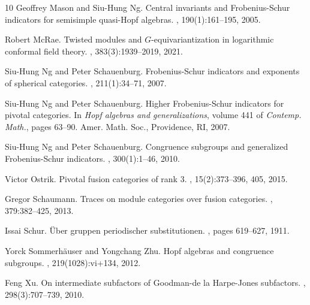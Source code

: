 \documentclass{amsart}
\begin{document}
\begin{thebibliography}{10}
Geoffrey Mason and Siu-Hung Ng.
\newblock Central invariants and {F}robenius-{S}chur indicators for semisimple
  quasi-{H}opf algebras.
, 190(1):161--195, 2005.

Robert McRae.
\newblock Twisted modules and {$G$}-equivariantization in logarithmic conformal
  field theory.
, 383(3):1939--2019, 2021.

Siu-Hung Ng and Peter Schauenburg.
\newblock Frobenius-{S}chur indicators and exponents of spherical categories.
, 211(1):34--71, 2007.

Siu-Hung Ng and Peter Schauenburg.
\newblock Higher {F}robenius-{S}chur indicators for pivotal categories.
\newblock In {\em Hopf algebras and generalizations}, volume 441 of {\em
  Contemp. Math.}, pages 63--90. Amer. Math. Soc., Providence, RI, 2007.

Siu-Hung Ng and Peter Schauenburg.
\newblock Congruence subgroups and generalized {F}robenius-{S}chur indicators.
, 300(1):1--46, 2010.

Victor Ostrik.
\newblock Pivotal fusion categories of rank 3.
, 15(2):373--396, 405, 2015.

Gregor Schaumann.
\newblock Traces on module categories over fusion categories.
, 379:382--425, 2013.

Issai Schur.
\newblock Über gruppen periodischer substitutionen.
,
  pages 619--627, 1911.

Yorck Sommerh\"auser and Yongchang Zhu.
\newblock Hopf algebras and congruence subgroups.
, 219(1028):vi+134, 2012.

Feng Xu.
\newblock On intermediate subfactors of {G}oodman-de la {H}arpe-{J}ones
  subfactors.
, 298(3):707--739, 2010.

\end{thebibliography}
\end{document}
